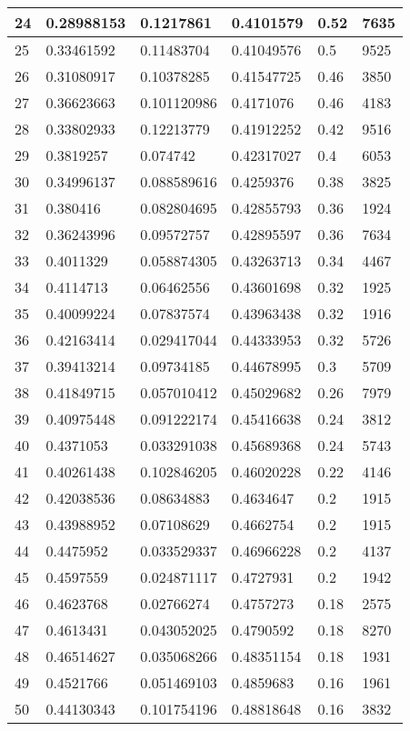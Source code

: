 \begin{longtable}{|l|l|l|l|l|l|}
24 & 0.28988153 & 0.1217861 & 0.4101579 & 0.52 & 7635 \\ \hline 
25 & 0.33461592 & 0.11483704 & 0.41049576 & 0.5 & 9525 \\ \hline 
26 & 0.31080917 & 0.10378285 & 0.41547725 & 0.46 & 3850 \\ \hline 
27 & 0.36623663 & 0.101120986 & 0.4171076 & 0.46 & 4183 \\ \hline 
28 & 0.33802933 & 0.12213779 & 0.41912252 & 0.42 & 9516 \\ \hline 
29 & 0.3819257 & 0.074742 & 0.42317027 & 0.4 & 6053 \\ \hline 
30 & 0.34996137 & 0.088589616 & 0.4259376 & 0.38 & 3825 \\ \hline 
31 & 0.380416 & 0.082804695 & 0.42855793 & 0.36 & 1924 \\ \hline 
32 & 0.36243996 & 0.09572757 & 0.42895597 & 0.36 & 7634 \\ \hline 
33 & 0.4011329 & 0.058874305 & 0.43263713 & 0.34 & 4467 \\ \hline 
34 & 0.4114713 & 0.06462556 & 0.43601698 & 0.32 & 1925 \\ \hline 
35 & 0.40099224 & 0.07837574 & 0.43963438 & 0.32 & 1916 \\ \hline 
36 & 0.42163414 & 0.029417044 & 0.44333953 & 0.32 & 5726 \\ \hline 
37 & 0.39413214 & 0.09734185 & 0.44678995 & 0.3 & 5709 \\ \hline 
38 & 0.41849715 & 0.057010412 & 0.45029682 & 0.26 & 7979 \\ \hline 
39 & 0.40975448 & 0.091222174 & 0.45416638 & 0.24 & 3812 \\ \hline 
40 & 0.4371053 & 0.033291038 & 0.45689368 & 0.24 & 5743 \\ \hline 
41 & 0.40261438 & 0.102846205 & 0.46020228 & 0.22 & 4146 \\ \hline 
42 & 0.42038536 & 0.08634883 & 0.4634647 & 0.2 & 1915 \\ \hline 
43 & 0.43988952 & 0.07108629 & 0.4662754 & 0.2 & 1915 \\ \hline 
44 & 0.4475952 & 0.033529337 & 0.46966228 & 0.2 & 4137 \\ \hline 
45 & 0.4597559 & 0.024871117 & 0.4727931 & 0.2 & 1942 \\ \hline 
46 & 0.4623768 & 0.02766274 & 0.4757273 & 0.18 & 2575 \\ \hline 
47 & 0.4613431 & 0.043052025 & 0.4790592 & 0.18 & 8270 \\ \hline 
48 & 0.46514627 & 0.035068266 & 0.48351154 & 0.18 & 1931 \\ \hline 
49 & 0.4521766 & 0.051469103 & 0.4859683 & 0.16 & 1961 \\ \hline 
50 & 0.44130343 & 0.101754196 & 0.48818648 & 0.16 & 3832 \\ \hline 
\end{longtable}